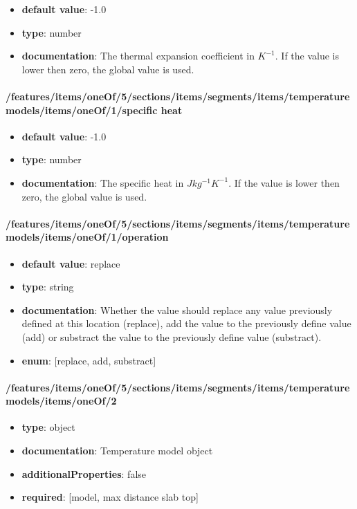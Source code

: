 \begin{itemize}\item {\bf default value}: -1.0
\item {\bf type}: number
\item {\bf documentation}: The thermal expansion coefficient in $K^{-1}$. If the value is lower then zero, the global value is used.
\end{itemize}\paragraph{/features/items/oneOf/5/sections/items/segments/items/temperature models/items/oneOf/1/specific heat}
\begin{itemize}\item {\bf default value}: -1.0
\item {\bf type}: number
\item {\bf documentation}: The specific heat in $J kg^{-1} K^{-1}$. If the value is lower then zero, the global value is used.
\end{itemize}\paragraph{/features/items/oneOf/5/sections/items/segments/items/temperature models/items/oneOf/1/operation}
\begin{itemize}\item {\bf default value}: replace
\item {\bf type}: string
\item {\bf documentation}: Whether the value should replace any value previously defined at this location (replace), add the value to the previously define value (add) or substract the value to the previously define value (substract).
\item {\bf enum}: [replace, add, substract]\end{itemize}\paragraph{/features/items/oneOf/5/sections/items/segments/items/temperature models/items/oneOf/2}
\begin{itemize}\item {\bf type}: object
\item {\bf documentation}: Temperature model object
\item {\bf additionalProperties}: false
\item {\bf required}: [model, max distance slab top]\end{itemize}
